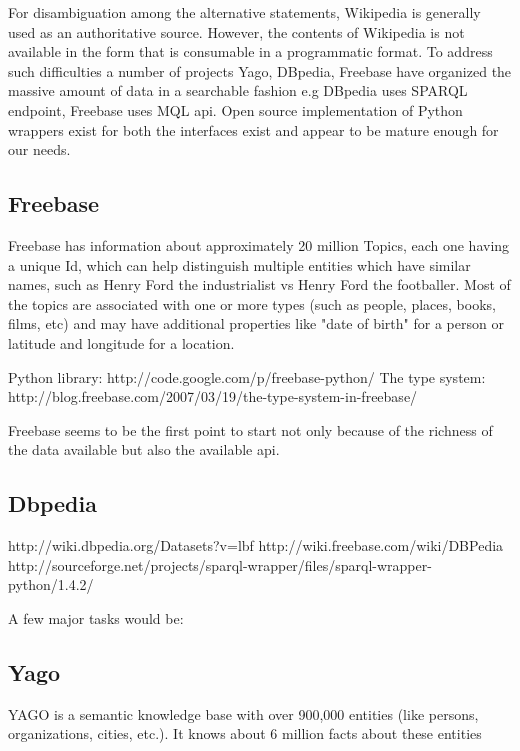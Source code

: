 \documentclass[11pt]{article}
\begin{document}
For disambiguation among the alternative statements, Wikipedia is generally used
as an authoritative source. However, the contents of Wikipedia is not available
in the form that is consumable in a programmatic format. To address such
difficulties a number of projects Yago, DBpedia, Freebase have organized the
massive amount of data in a searchable fashion e.g DBpedia uses SPARQL endpoint,
Freebase uses MQL api. Open source implementation of Python wrappers exist for
both the interfaces exist and appear to be mature enough for our needs.

\subsection{Freebase} 
Freebase has information about approximately 20 million Topics,
each one having a unique Id, which can help distinguish multiple entities which
have similar names, such as Henry Ford the industrialist vs Henry Ford the
footballer. Most of the topics are associated with one or more types (such as
people, places, books, films, etc) and may have additional properties like "date
of birth" for a person or latitude and longitude for a location.


Python library: http://code.google.com/p/freebase-python/ The type system:
http://blog.freebase.com/2007/03/19/the-type-system-in-freebase/

Freebase seems to be the first point to start not only because of
the richness of the data available but also the available api. 




\subsection{Dbpedia}


http://wiki.dbpedia.org/Datasets?v=lbf
http://wiki.freebase.com/wiki/DBPedia
http://sourceforge.net/projects/sparql-wrapper/files/sparql-wrapper-python/1.4.2/ 


A few major tasks would be:

\subsection{Yago}
YAGO is a semantic knowledge base with over 900,000 entities (like persons,
organizations, cities, etc.). It knows about 6 million facts about these entities
\end{document}
